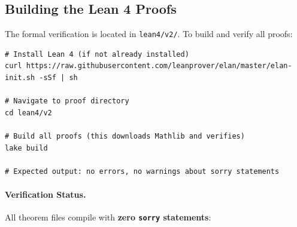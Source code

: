 
\subsection{Building the Lean 4 Proofs}

The formal verification is located in \texttt{lean4/v2/}. To build and verify all proofs:

\begin{verbatim}
# Install Lean 4 (if not already installed)
curl https://raw.githubusercontent.com/leanprover/elan/master/elan-init.sh -sSf | sh

# Navigate to proof directory
cd lean4/v2

# Build all proofs (this downloads Mathlib and verifies)
lake build

# Expected output: no errors, no warnings about sorry statements
\end{verbatim}

\paragraph{Verification Status.}
All theorem files compile with \textbf{zero \texttt{sorry} statements}:

